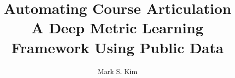 \documentclass[draft]{sfsuthesis}
\begin{document}

\title{Automating Course Articulation\\\vspace*{2mm}\large A Deep Metric Learning Framework Using Public Data}
\makeatletter
\newcommand{\@approvaltitle}{Automating Course Articulation: A Deep Metric Learning Framework Using Public Data}
\makeatother
\author{Mark S. Kim}



\maketitle
\copyrightpage
\approvalpage




\begin{frontmatter}




    

    \tableofcontents
    \clearpage
    \listoftables
    \clearpage
    \listoffigures
    \clearpage

\end{frontmatter}

% 

\pagestyle{headings}








\sloppy
\printbibliography
\fussy

% 
\end{document}
